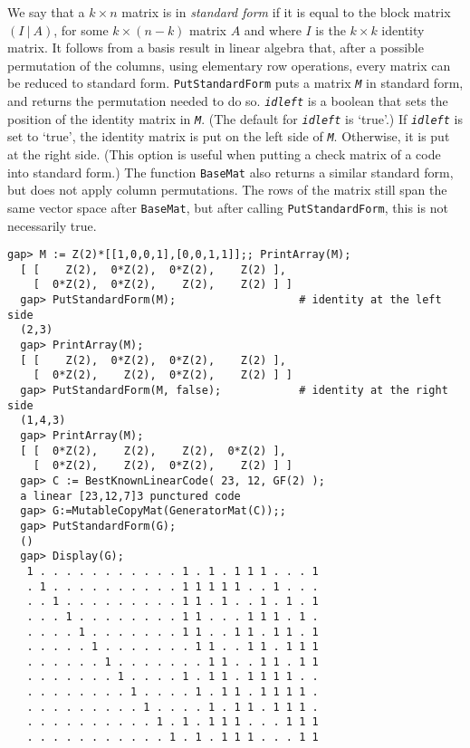 \documentclass[a4paper,11pt]{report}
\begin{document}
{{{ We say that a $k\times n$ matrix is in \emph{standard form} if it is equal to the block matrix $(I\ |\ A)$, for some $k\times (n-k)$ matrix $A$ and where $I$ is the $k\times k$ identity matrix. It follows from a basis result in linear algebra that, after
a possible permutation of the columns, using elementary row operations, every
matrix can be reduced to standard form. \texttt{PutStandardForm} puts a matrix \mbox{\texttt{\slshape M}} in standard form, and returns the permutation needed to do so. \mbox{\texttt{\slshape idleft}} is a boolean that sets the position of the identity matrix in \mbox{\texttt{\slshape M}}. (The default for \mbox{\texttt{\slshape idleft}} is `true'.) If \mbox{\texttt{\slshape idleft}} is set to `true', the identity matrix is put on the left side of \mbox{\texttt{\slshape M}}. Otherwise, it is put at the right side. (This option is useful when putting
a check matrix of a code into standard form.) The function \texttt{BaseMat} also returns a similar standard form, but does not apply column permutations.
The rows of the matrix still span the same vector space after \texttt{BaseMat}, but after calling \texttt{PutStandardForm}, this is not necessarily true. }

 
\begin{Verbatim}[fontsize=\small,frame=single,label=Example]
  gap> M := Z(2)*[[1,0,0,1],[0,0,1,1]];; PrintArray(M);
  [ [    Z(2),  0*Z(2),  0*Z(2),    Z(2) ],
    [  0*Z(2),  0*Z(2),    Z(2),    Z(2) ] ]
  gap> PutStandardForm(M);                   # identity at the left side
  (2,3)
  gap> PrintArray(M);
  [ [    Z(2),  0*Z(2),  0*Z(2),    Z(2) ],
    [  0*Z(2),    Z(2),  0*Z(2),    Z(2) ] ]
  gap> PutStandardForm(M, false);            # identity at the right side
  (1,4,3)
  gap> PrintArray(M);
  [ [  0*Z(2),    Z(2),    Z(2),  0*Z(2) ],
    [  0*Z(2),    Z(2),  0*Z(2),    Z(2) ] ]
  gap> C := BestKnownLinearCode( 23, 12, GF(2) );
  a linear [23,12,7]3 punctured code
  gap> G:=MutableCopyMat(GeneratorMat(C));;
  gap> PutStandardForm(G);
  ()
  gap> Display(G);
   1 . . . . . . . . . . . 1 . 1 . 1 1 1 . . . 1
   . 1 . . . . . . . . . . 1 1 1 1 1 . . 1 . . .
   . . 1 . . . . . . . . . 1 1 . 1 . . 1 . 1 . 1
   . . . 1 . . . . . . . . 1 1 . . . 1 1 1 . 1 .
   . . . . 1 . . . . . . . 1 1 . . 1 1 . 1 1 . 1
   . . . . . 1 . . . . . . . 1 1 . . 1 1 . 1 1 1
   . . . . . . 1 . . . . . . . 1 1 . . 1 1 . 1 1
   . . . . . . . 1 . . . . 1 . 1 1 . 1 1 1 1 . .
   . . . . . . . . 1 . . . . 1 . 1 1 . 1 1 1 1 .
   . . . . . . . . . 1 . . . . 1 . 1 1 . 1 1 1 .
   . . . . . . . . . . 1 . 1 . 1 1 1 . . . 1 1 1
   . . . . . . . . . . . 1 . 1 . 1 1 1 . . . 1 1
  

\end{Verbatim}}}
\end{document}

